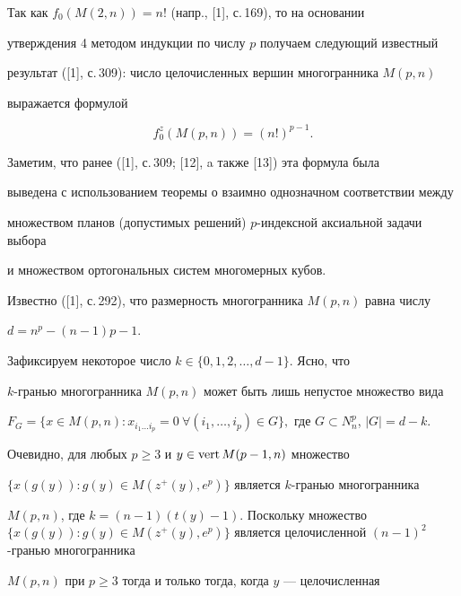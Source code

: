 Так как $f_0(M(2,n))=n!$ (напр., [1], с.\,169), то на основании


утверждения 4 методом индукции по числу $p$ получаем следующий известный


результат ([1], с.\,309): число целочисленных вершин многогранника $M(p,n)$


выражается формулой


\begin{equation}


f^z_0(M(p,n))=(n!)^{p-1}.


\end{equation}





Заметим, что ранее ([1], с.\,309; [12], a также [13]) эта формула была


выведена с использованием теоремы о взаимно однозначном соответствии между


множеством планов (допустимых решений) $p$-индексной аксиальной задачи выбора


и множеством ортогональных систем многомерных кубов.





Известно ([1], с.\,292), что размерность многогранника $M(p,n)$ равна числу


$d=n^p-(n-1)p-1$.





Зафиксируем некоторое число $k\in \{0,1,2,\dotsc,d-1\}$. Ясно, что


$k$-гранью многогранника $M(p,n)$ может быть лишь непустое множество вида


$F_G=\{x\in M(p,n): x_{i_1 \dotsc i_p}=0\ \forall (i_1, \dotsc, i_p)


\in G\},$ где $G\subset N^p_n$, $|G|=d-k$.





Очевидно, для любых $p\geq 3$ и $y\in\operatorname{vert} M(p-1,n)$ множество


$\{x(g(y)):g(y)\in M(z^+(y),e^p)\}$ является $k$-гранью многогранника


$M(p,n)$, где $k=(n-1)(t(y)-1)$. Поскольку множество $\{x(g(y)): g(y)\in


M(z^+(y),e^p)\}$ является целочисленной $(n-1)^2$-гранью многогранника


$M(p,n)$ при $p\geq 3$ тогда и только тогда, когда $y$ --- целочисленная


